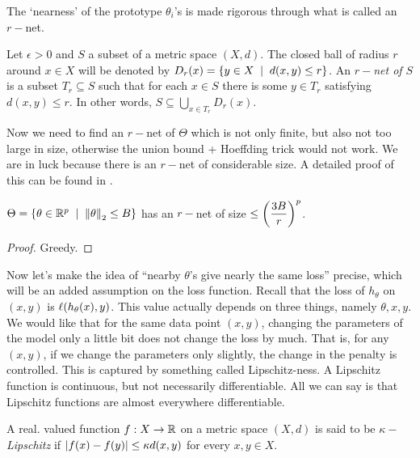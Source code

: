 The `nearness' of the prototype $\theta_{i}$'s is made rigorous through what is called an $r-$net.
\begin{defn}[$r-$net]
Let $\epsilon>0$ and $S$ a subset of a metric space $(X,d)$. The closed ball of radius $r$ around $x\in X$ will be denoted by $D_{r}(x) = \set{y\in X\st d(x,y)\le r}$. An \textit{$r-$net of $S$} is a subset $T_{r}\subseteq S$ such that for each $x\in S$ there is some $y\in T_{r}$ satisfying $d(x,y)\le r$. In other words, $S \subseteq \bigcup\limits_{x\in T_{r}}D_{r}(x)$.
\end{defn}

Now we need to find an $r-$net of $\Theta$ which is not only finite, but also not too large in size, otherwise the union bound + Hoeffding trick would not work. We are in luck because there is an $r-$net of considerable size. A detailed proof of this can be found in .

\begin{lemma}\label{lem:rnet}
$\Theta = \set{\theta\in\R^{p} \st \norm \theta2\le B}$ has an $r-$net of size $\displaystyle\le\left(\frac{3B}{r}\right)^{p}$. 
\end{lemma}
\begin{proof}
Greedy.
\end{proof}

Now let's make the idea of ``nearby $\theta$'s give nearly the same loss'' precise, which will be an added assumption on the loss function. Recall that the loss of $h_{\theta}$ on $(x,y)$ is $\ell(h_{\theta}(x),y)$. This value actually depends on three things, namely $\theta,x,y$. We would like that for the same data point $(x,y)$, changing the parameters of the model only a little bit does not change the loss by much. That is, for any $(x,y)$, if we change the parameters only slightly, the change in the penalty is controlled. This is captured by something called Lipschitz-ness. A Lipschitz function is continuous, but not necessarily differentiable. All we can say is that Lipschitz functions are almost everywhere differentiable.
\begin{defn}
A real. valued function $f:X\to \mathbb{R}$ on a metric space $(X,d)$ is said to be \textit{$\kappa-$Lipschitz} if $\left| f(x) - f(y) \right| \le \kappa d(x,y)$ for every $x,y\in X$.
\end{defn}

